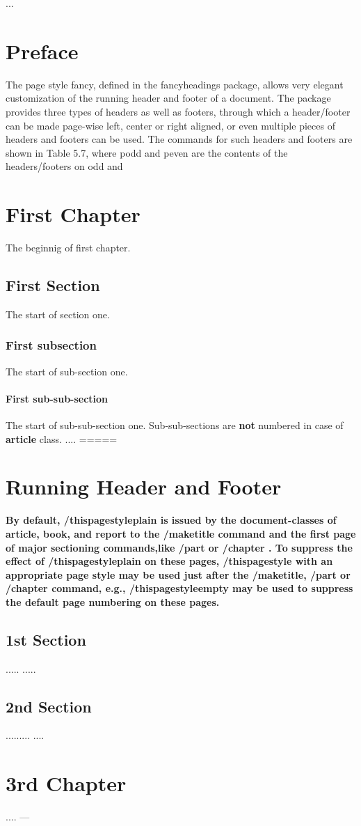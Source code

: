 \documentclass[a4paper,twoside]{book}
\begin{document}
 ...
 \chapter*{Preface}
 \huge 
 The page style fancy, 
 defined in the fancyheadings package, allows very elegant customization of the running header 
 and footer of a document. 
 The package provides three types of headers as well as footers, through which a header/footer can be made page-wise left, center or right aligned, 
 or even multiple pieces of headers and footers can be used. 
 The commands for such headers and footers are shown in Table 5.7, where podd and peven are the contents of the headers/footers on odd and
 
 \chapter{First Chapter}
     The beginnig of first chapter.
         \section{First Section}
         The start of section one.
             \subsection{First subsection}
             The start of sub-section one.
                 \subsubsection{First sub-sub-section}
                     The start of sub-sub-section one. Sub-sub-sections are {\bf\Huge not} numbered in case of {\bf\huge article} class.
                     \newpage
                     ....
                     \newpage
                     =====
 \chapter{Running Header and Footer}
 \bfseries\large
 By default, /thispagestyle{plain} is issued by the document-classes of article, book, and report to the 
 /maketitle command and the first page of major sectioning commands,like /part{ } or /chapter{ }. 
 To suppress the effect of /thispagestyle{plain} on these pages, /thispagestyle{ } with an appropriate
  page style may be used just after the /maketitle, /part{ } or /chapter{ } command, 
  e.g., /thispagestyle{empty} may be used to suppress the default page numbering on these pages.
     \section{1st Section}
     .....
     \newpage
     .....
     \newpage
     \section{2nd Section}
     .........
     \newpage
     ....
     \chapter{3rd Chapter}
     ....
     \newpage
        ---
\end{document}
